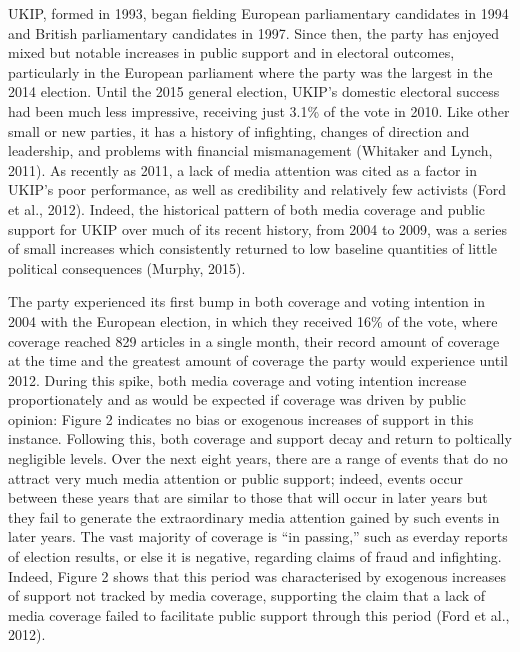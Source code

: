 \documentclass[12pt,article]{article}
\begin{document}
UKIP, formed in 1993, began fielding European parliamentary candidates
in 1994 and British parliamentary candidates in 1997. Since then, the
party has enjoyed mixed but notable increases in public support and in
electoral outcomes, particularly in the European parliament where the
party was the largest in the 2014 election. Until the 2015 general
election, UKIP's domestic electoral success had been much less
impressive, receiving just 3.1\% of the vote in 2010. Like other small
or new parties, it has a history of infighting, changes of direction and
leadership, and problems with financial mismanagement (Whitaker and
Lynch, 2011). As recently as 2011, a lack of media attention was cited
as a factor in UKIP's poor performance, as well as credibility and
relatively few activists (Ford et al., 2012). Indeed, the historical
pattern of both media coverage and public support for UKIP over much of
its recent history, from 2004 to 2009, was a series of small increases
which consistently returned to low baseline quantities of little
political consequences (Murphy, 2015).

The party experienced its first bump in both coverage and voting
intention in 2004 with the European election, in which they received
16\% of the vote, where coverage reached 829 articles in a single month,
their record amount of coverage at the time and the greatest amount of
coverage the party would experience until 2012. During this spike, both
media coverage and voting intention increase proportionately and as
would be expected if coverage was driven by public opinion: Figure 2
indicates no bias or exogenous increases of support in this instance.
Following this, both coverage and support decay and return to poltically
negligible levels. Over the next eight years, there are a range of
events that do no attract very much media attention or public support;
indeed, events occur between these years that are similar to those that
will occur in later years but they fail to generate the extraordinary
media attention gained by such events in later years. The vast majority
of coverage is ``in passing,'' such as everday reports of election
results, or else it is negative, regarding claims of fraud and
infighting. Indeed, Figure 2 shows that this period was characterised by
exogenous increases of support not tracked by media coverage, supporting
the claim that a lack of media coverage failed to facilitate public
support through this period (Ford et al., 2012).
\end{document}
